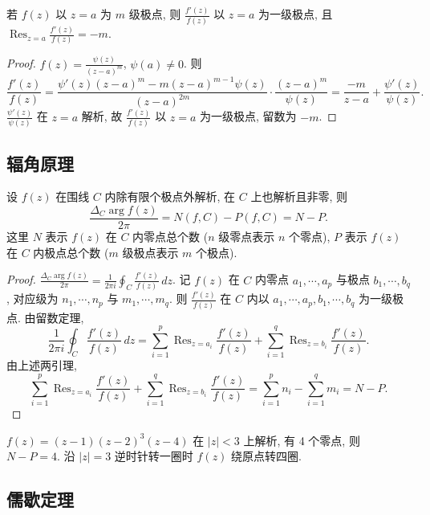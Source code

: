 \documentclass[theorem=false,mathfont=none,openany,sub3section]{easybook}
\begin{document}
\begin{lemma}
  若 $f(z)$ 以 $z=a$ 为 $m$ 级极点, 则 $\frac{f'(z)}{f(z)}$ 以 $z=a$ 为一级极点, 且 $\operatorname{Res}_{z=a}\frac{f'(z)}{f(z)}=-m$.
\end{lemma}

\begin{proof}
  $f(z)=\frac{\psi(z)}{(z-a)^{m}}$, $\psi(a)\neq0$. 则
  \[
  \frac{f'(z)}{f(z)}=\frac{\psi'(z)(z-a)^{m}-m(z-a)^{m-1}\psi(z)}{(z-a)^{2m}}\cdot\frac{(z-a)^{m}}{\psi(z)}
  =\frac{-m}{z-a}+\frac{\psi'(z)}{\psi(z)}.
  \]
  $\frac{\psi'(z)}{\psi(z)}$ 在 $z=a$ 解析, 故 $\frac{f'(z)}{f(z)}$ 以 $z=a$ 为一级极点, 留数为 $-m$.
\end{proof}

\subsection{辐角原理}

\begin{theorem}[辐角原理]
  设 $f(z)$ 在围线 $C$ 内除有限个极点外解析, 在 $C$ 上也解析且非零, 则
  \[
  \frac{\Delta_{C}\arg f(z)}{2\pi}=N(f,C)-P(f,C)=N-P.
  \]
  这里 $N$ 表示 $f(z)$ 在 $C$ 内零点总个数 ($n$ 级零点表示 $n$ 个零点),
  $P$ 表示 $f(z)$ 在 $C$ 内极点总个数 ($m$ 级极点表示 $m$ 个极点).
\end{theorem}

\begin{proof}
  $\frac{\Delta_{C}\arg f(z)}{2\pi}=\frac{1}{2\pi i}\oint_{C}\frac{f'(z)}{f(z)}\,dz$.
  记 $f(z)$ 在 $C$ 内零点 $a_{1},\cdots,a_{p}$ 与极点 $b_{1},\cdots,b_{q}$, 对应级为 $n_{1},\cdots,n_{p}$ 与 $m_{1},\cdots,m_{q}$.
  则 $\frac{f'(z)}{f(z)}$ 在 $C$ 内以 $a_{1},\cdots,a_{p},b_{1},\cdots,b_{q}$ 为一级极点.
  由留数定理,
  \[
  \frac{1}{2\pi i}\oint_{C}\frac{f'(z)}{f(z)}\,dz
  =\sum_{i=1}^{p}\operatorname{Res}_{z=a_{i}}\frac{f'(z)}{f(z)}
  +\sum_{i=1}^{q}\operatorname{Res}_{z=b_{i}}\frac{f'(z)}{f(z)}.
  \]
  由上述两引理,
  \[
  \sum_{i=1}^{p}\operatorname{Res}_{z=a_{i}}\frac{f'(z)}{f(z)}
  +\sum_{i=1}^{q}\operatorname{Res}_{z=b_{i}}\frac{f'(z)}{f(z)}
  =\sum_{i=1}^{p}n_{i}-\sum_{i=1}^{q}m_{i}=N-P.
  \]
\end{proof}

\begin{example}
  $f(z)=(z-1)(z-2)^{3}(z-4)$ 在 $|z|<3$ 上解析, 有 4 个零点, 则 $N-P=4$.
  沿 $|z|=3$ 逆时针转一圈时 $f(z)$ 绕原点转四圈.
\end{example}

\subsection{儒歇定理}
\end{document}
